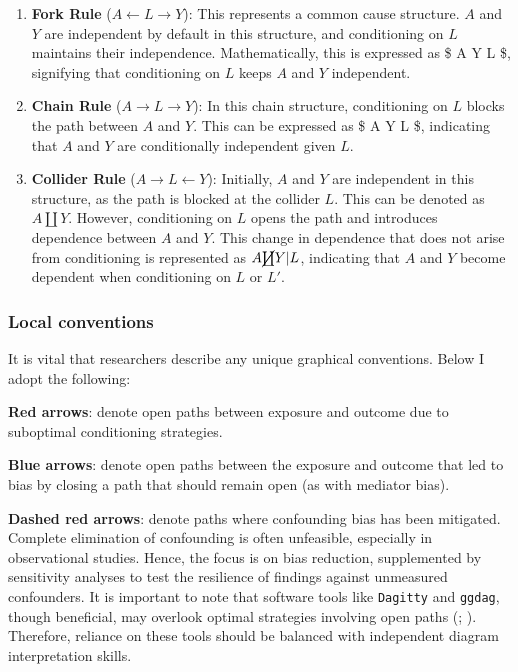 \documentclass[
  singlecolumn,
  9pt]{article}
\begin{document}
\begin{enumerate}
\def\labelenumi{\arabic{enumi}.}
\item
  \textbf{Fork Rule} (\(A \leftarrow L \rightarrow Y\)): This represents
  a common cause structure. \(A\) and \(Y\) are independent by default
  in this structure, and conditioning on \(L\) maintains their
  independence. Mathematically, this is expressed as \$ A \coprod Y
  \textbar{} L \$, signifying that conditioning on \(L\) keeps \(A\) and
  \(Y\) independent.
\item
  \textbf{Chain Rule} (\(A \rightarrow L \rightarrow Y\)): In this chain
  structure, conditioning on \(L\) blocks the path between \(A\) and
  \(Y\). This can be expressed as \$ A \coprod Y \textbar{} L \$,
  indicating that \(A\) and \(Y\) are conditionally independent given
  \(L\).
\item
  \textbf{Collider Rule} (\(A \rightarrow L \leftarrow Y\)): Initially,
  \(A\) and \(Y\) are independent in this structure, as the path is
  blocked at the collider \(L\). This can be denoted as \(A \coprod Y\).
  However, conditioning on \(L\) opens the path and introduces
  dependence between \(A\) and \(Y\). This change in dependence that
  does not arise from conditioning is represented as
  \(A \cancel{\coprod} Y | L\), indicating that \(A\) and \(Y\) become
  dependent when conditioning on \(L\) or \(L'\).
\end{enumerate}

\subsubsection{Local conventions}\label{local-conventions}

It is vital that researchers describe any unique graphical conventions.
Below I adopt the following:

\textbf{Red arrows}: denote open paths between exposure and outcome due
to suboptimal conditioning strategies.

\textbf{Blue arrows}: denote open paths between the exposure and outcome
that led to bias by closing a path that should remain open (as with
mediator bias).

\textbf{Dashed red arrows}: denote paths where confounding bias has been
mitigated. Complete elimination of confounding is often unfeasible,
especially in observational studies. Hence, the focus is on bias
reduction, supplemented by sensitivity analyses to test the resilience
of findings against unmeasured confounders. It is important to note that
software tools like \texttt{Dagitty} and \texttt{ggdag}, though
beneficial, may overlook optimal strategies involving open paths
(;
). Therefore,
reliance on these tools should be balanced with independent diagram
interpretation skills.
\end{document}

